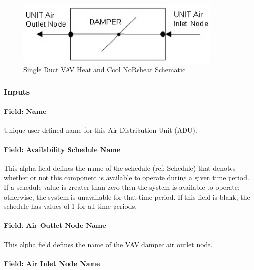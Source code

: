 \begin{figure}[hbtp] %
\centering
\includegraphics[width=0.9\textwidth, height=0.9\textheight, keepaspectratio=true]{media/image268.png}
\caption{Single Duct VAV Heat and Cool NoReheat Schematic \protect \label{fig:single-duct-vav-heat-and-cool-noreheat}}
\end{figure}

\subsubsection{Inputs}\label{inputs-6-000}

\paragraph{Field: Name}\label{field-name-6-000}

Unique user-defined name for this Air Distribution Unit (ADU).

\paragraph{Field: Availability Schedule Name}\label{field-availability-schedule-name-6}

This alpha field defines the name of the schedule (ref: Schedule) that denotes whether or not this component is available to operate during a given time period. If a schedule value is greater than zero then the system is available to operate; otherwise, the system is unavailable for that time period. If this field is blank, the schedule has values of 1 for all time periods.

\paragraph{Field: Air Outlet Node Name}\label{field-air-outlet-node-name-5}

This alpha field defines the name of the VAV damper air outlet node.

\paragraph{Field: Air Inlet Node Name}\label{field-air-inlet-node-name-5}

